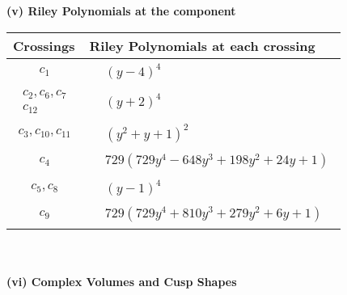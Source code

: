 \documentclass[1p]{elsarticle_modified}
\theoremstyle{definition}
\begin{document}
\newpage\renewcommand{\arraystretch}{1}
\flushleft \textbf{(v) Riley Polynomials at the component}\newline \\
\begin{tabular}{m{50pt}|m{274pt}}
Crossings & \hspace{64pt}Riley Polynomials at each crossing \\
\hline $$\begin{aligned}c_{1}\end{aligned}$$&$\begin{aligned}
&(y-4)^4
\end{aligned}$\\
\hline $$\begin{aligned}c_{2},c_{6},c_{7}\\c_{12}\end{aligned}$$&$\begin{aligned}
&(y+2)^4
\end{aligned}$\\
\hline $$\begin{aligned}c_{3},c_{10},c_{11}\end{aligned}$$&$\begin{aligned}
&(y^2+y+1)^2
\end{aligned}$\\
\hline $$\begin{aligned}c_{4}\end{aligned}$$&$\begin{aligned}
&729(729 y^4-648 y^3+198 y^2+24 y+1)
\end{aligned}$\\
\hline $$\begin{aligned}c_{5},c_{8}\end{aligned}$$&$\begin{aligned}
&(y-1)^4
\end{aligned}$\\
\hline $$\begin{aligned}c_{9}\end{aligned}$$&$\begin{aligned}
&729(729 y^4+810 y^3+279 y^2+6 y+1)
\end{aligned}$\\
\hline
\end{tabular}\\~\\
\newpage\flushleft \textbf{(vi) Complex Volumes and Cusp Shapes}
\end{document}
